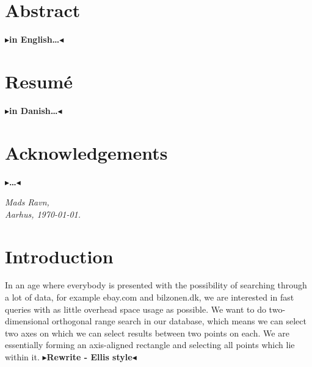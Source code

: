 \documentclass[twoside,11pt,openright]{report}
\newcommand{\todo}[1]{{\color[rgb]{.5,0,0}\textbf{$\blacktriangleright$#1$\blacktriangleleft$}}}
\begin{document}

\pagestyle{empty} 
\vspace*{\fill}
\clearpage


\pagestyle{plain}
\chapter*{Abstract}

\todo{in English\dots}

\chapter*{Resum\'e}

\todo{in Danish\dots}

\chapter*{Acknowledgements}

\todo{\dots}

\vspace{2ex}
\begin{flushright}
  \emph{Mads Ravn,}\\
  \emph{Aarhus, \today.}
\end{flushright}

\tableofcontents
{}
\setcounter{secnumdepth}{2}


\chapter{Introduction}
\label{ch:intro}
In an age where everybody is presented with the possibility of searching through a lot of data, for example ebay.com and bilzonen.dk, we are interested in fast queries with as little overhead space usage as possible. We want to do two-dimensional orthogonal range search in our database, which means we can select two axes on which we can select results between two points on each. We are essentially forming an axis-aligned rectangle and selecting all points which lie within it. \todo{Rewrite - Ellis style} \\
\end{document}
